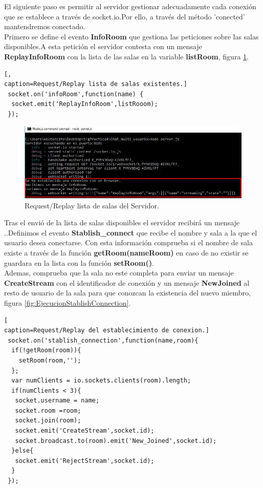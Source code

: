 El siguiente paso es permitir al servidor gestionar adecuadamente cada conexión que se establece a través de socket.io.Por ello, a través del método 'conected' mantendremos conectado.
\\Primero se define el evento \textbf{InfoRoom} que gestiona las peticiones sobre las salas disponibles.A esta petición el servidor contesta con un mensaje \textbf{ReplayInfoRoom} con la lista de las salas en la variable \textbf{listRoom}, figura \ref{fig:EjecucionInfoRoom}.
\begin{lstlisting}[,
caption=Request/Replay lista de salas existentes.]
 socket.on('infoRoom',function(name) {
  socket.emit('ReplayInfoRoom',listRooom);
 });
\end{lstlisting}
\begin{figure}[!h]
\begin{center}
   \includegraphics[width=0.8\linewidth]{Figures/InfoRoomServer}
	\decoRule
	\caption[Request/Replay Salas Servidor]{Request/Replay lista de salas del Servidor.}
\label{fig:EjecucionInfoRoom}
\end{center}
\end{figure}
Tras el envió de la lista de salas disponibles el servidor recibirá un mensaje ..Definimos el evento \textbf{Stablish\_connect} que recibe el nombre y sala a la que el usuario desea conectarse. Con esta información comprueba si el nombre de sala existe a través de la función \textbf{getRoom(nameRoom)} en caso de no existir se guardara en la lista con la función \textbf{setRoom()}.
\\Ademas, comprueba que la sala no este completa para enviar un mensaje \textbf{CreateStream} con el identificador de conexión y un mensaje  \textbf{NewJoined} al resto de usuario de la sala para que conozcan la existencia del nuevo miembro, figura \ref{fig:EjecucionStablishConnection}.
\begin{lstlisting}[
caption=Request/Replay del establecimiento de conexion.]
 socket.on('stablish_connection',function(name,room){
  if(!getRoom(room)){
    setRoom(room,'');
  };
  var numClients = io.sockets.clients(room).length;
  if(numClients < 3){
   socket.username = name;
   socket.room =room;
   socket.join(room);
   socket.emit('CreateStream',socket.id);
   socket.broadcast.to(room).emit('New_Joined',socket.id);
  }else{
   socket.emit('RejectStream',socket.id);
  }
 });
\end{lstlisting}
